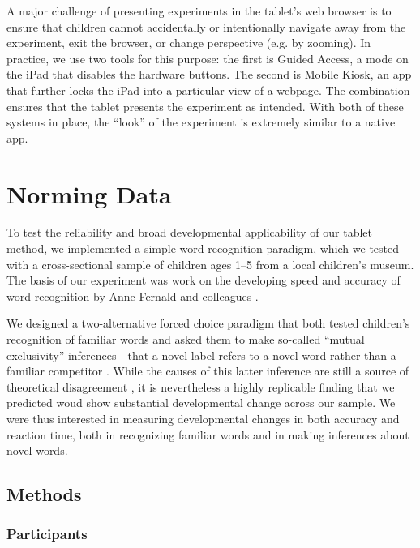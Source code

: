 \documentclass[man,noapacite]{apa2}
\begin{document}
A major challenge of presenting experiments in the tablet's web browser is to ensure that children cannot accidentally or intentionally navigate away from the experiment, exit the browser, or change perspective (e.g. by zooming). In practice, we use two tools for this purpose: the first is Guided Access, a mode on the iPad that disables the hardware buttons. The second is Mobile Kiosk, an app that further locks the iPad into a particular view of a webpage. The combination ensures that the tablet presents the experiment as intended. With both of these systems in place, the ``look'' of the experiment is extremely similar to a native app. 

\section{Norming Data}
 
To test the reliability and broad developmental applicability of our tablet method, we implemented a simple word-recognition paradigm, which we tested with a cross-sectional sample of children ages 1--5 from a local children's museum. The basis of our experiment was work on the developing speed and accuracy of word recognition by Anne Fernald and colleagues \cite{fernald1998,fernald2006,bion2013}. 

We designed a two-alternative forced choice paradigm that both tested children's recognition of familiar words and asked them to make so-called ``mutual exclusivity'' inferences---that a novel label refers to a novel word rather than a familiar competitor \cite{markman1988}. While the causes of this latter inference are still a source of theoretical disagreement \cite{markman2003,diesendruck2001,frank2009,bion2013}, it is nevertheless a highly replicable finding that we predicted woud show substantial developmental change across our sample.  We were thus interested in measuring developmental changes in both accuracy and reaction time, both in recognizing familiar words and in making inferences about novel words. 

\subsection{Methods}

\subsubsection{Participants}                                                                                                                              
\end{document}
